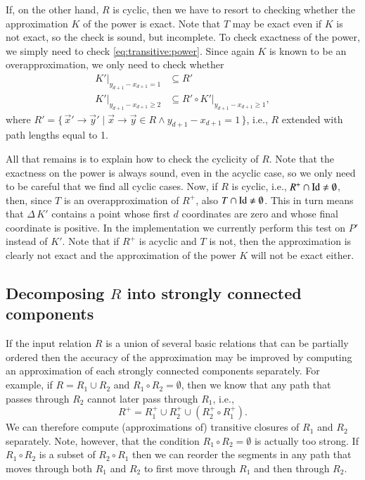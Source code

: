 If, on the other hand, $R$ is cyclic, then we have to resort
to checking whether the approximation $K$ of the power is exact.
Note that $T$ may be exact even if $K$ is not exact, so the check
is sound, but incomplete.
To check exactness of the power, we simply need to check
\eqref{eq:transitive:power}.  Since again $K$ is known
to be an overapproximation, we only need to check whether
$$
\begin{aligned}
K'|_{y_{d+1} - x_{d+1} = 1} & \subseteq R'
\\
K'|_{y_{d+1} - x_{d+1} \ge 2} & \subseteq R' \circ K'|_{y_{d+1} - x_{d+1} \ge 1}
,
\end{aligned}
$$
where $R' = \{\, \vec x' \to \vec y' \mid \vec x \to \vec y \in R
\wedge y_{d+1} - x_{d+1} = 1\,\}$, i.e., $R$ extended with path
lengths equal to 1.

All that remains is to explain how to check the cyclicity of $R$.
Note that the exactness on the power is always sound, even
in the acyclic case, so we only need to be careful that we find
all cyclic cases.  Now, if $R$ is cyclic, i.e.,
$R^+ \cap \mathop{\rm Id}\nolimits \ne \emptyset$, then, since $T$ is
an overapproximation of $R^+$, also
$T \cap \mathop{\rm Id}\nolimits \ne \emptyset$.  This in turn means
that $\Delta \, K'$ contains a point whose first $d$ coordinates
are zero and whose final coordinate is positive.
In the implementation we currently perform this test on $P'$ instead of $K'$.
Note that if $R^+$ is acyclic and $T$ is not, then the approximation
is clearly not exact and the approximation of the power $K$
will not be exact either.

\subsection{Decomposing $R$ into strongly connected components}

If the input relation $R$ is a union of several basic relations
that can be partially ordered
then the accuracy of the approximation may be improved by computing
an approximation of each strongly connected components separately.
For example, if $R = R_1 \cup R_2$ and $R_1 \circ R_2 = \emptyset$,
then we know that any path that passes through $R_2$ cannot later
pass through $R_1$, i.e.,
$$
R^+ = R_1^+ \cup R_2^+ \cup \left(R_2^+ \circ R_1^+\right)
.
$$
We can therefore compute (approximations of) transitive closures
of $R_1$ and $R_2$ separately.
Note, however, that the condition $R_1 \circ R_2 = \emptyset$
is actually too strong.
If $R_1 \circ R_2$ is a subset of $R_2 \circ R_1$
then we can reorder the segments
in any path that moves through both $R_1$ and $R_2$ to
first move through $R_1$ and then through $R_2$.

